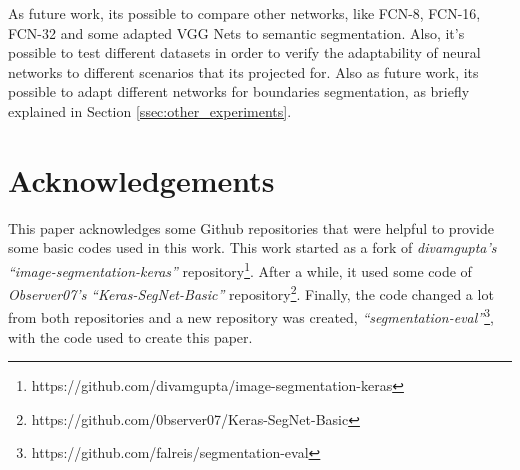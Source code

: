 \documentclass[10pt,twocolumn,letterpaper]{article}
\begin{document}
As future work, its possible to compare other networks, like FCN-8, FCN-16, FCN-32 \cite{FULLY_CONVOLU} and some adapted VGG Nets \cite{VGGNET} to semantic segmentation. Also, it's possible to test different datasets in order to verify the adaptability of neural networks to different scenarios that its projected for. Also as future work, its possible to adapt different networks for boundaries segmentation, as briefly explained in Section \ref{ssec:other_experiments}.

\section{Acknowledgements} \label{sec:acknowledgements}

This paper acknowledges some Github repositories that were helpful to provide some basic codes used in this work. This work started as a fork of \textit{divamgupta's} \textit{``image-segmentation-keras''} repository\footnote{https://github.com/divamgupta/image-segmentation-keras}. After a while, it used some code of \textit{Observer07's} \textit{``Keras-SegNet-Basic''} repository\footnote{https://github.com/0bserver07/Keras-SegNet-Basic}. Finally, the code changed a lot from both repositories and a new repository was created, \textit{``segmentation-eval''}\footnote{https://github.com/falreis/segmentation-eval}, with the code used to create this paper.

{\small


}
\end{document}
